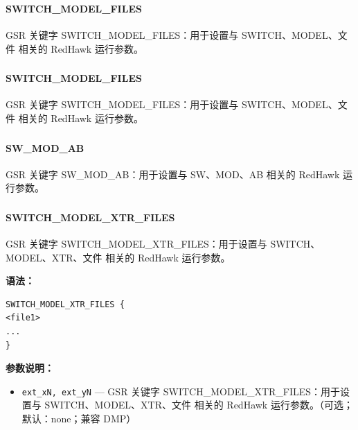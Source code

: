 \subsubsection{}
\paragraph*{SWITCH_MODEL_FILES}

GSR 关键字 SWITCH_MODEL_FILES：用于设置与 SWITCH、MODEL、文件 相关的 RedHawk 运行参数。

\subsubsection{}
\paragraph*{SWITCH_MODEL_FILES}

GSR 关键字 SWITCH_MODEL_FILES：用于设置与 SWITCH、MODEL、文件 相关的 RedHawk 运行参数。

\subsubsection{}
\paragraph*{SW_MOD_AB}

GSR 关键字 SW_MOD_AB：用于设置与 SW、MOD、AB 相关的 RedHawk 运行参数。

\subsubsection{}
\paragraph*{SWITCH_MODEL_XTR_FILES}

GSR 关键字 SWITCH_MODEL_XTR_FILES：用于设置与 SWITCH、MODEL、XTR、文件 相关的 RedHawk 运行参数。

\textbf{语法：}
\begin{lstlisting}
SWITCH_MODEL_XTR_FILES {
<file1>
...
}
\end{lstlisting}

\textbf{参数说明：}
\begin{itemize}
\item \texttt{ext\_xN, ext\_yN} — GSR 关键字 SWITCH\_MODEL\_XTR\_FILES：用于设置与 SWITCH、MODEL、XTR、文件 相关的 RedHawk 运行参数。（可选；默认：none；兼容 DMP）
\end{itemize}

